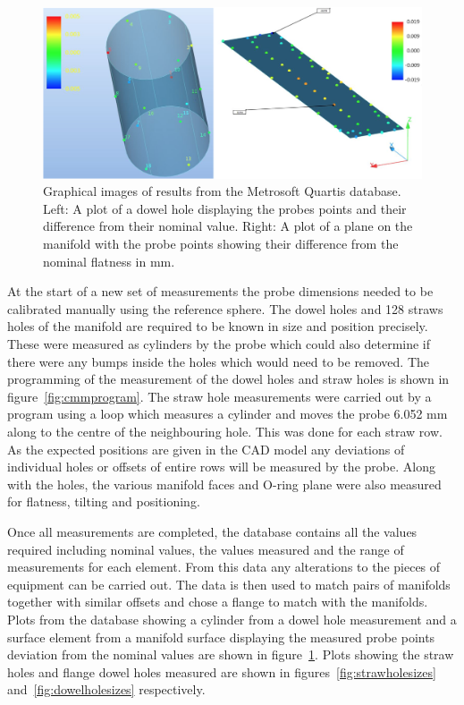 \begin{figure}[ht]
\centering
\includegraphics[scale=0.35]{Figures/cmmresults.png}
\decoRule
\caption{Graphical images of results from the Metrosoft Quartis database. Left: A plot of a dowel hole displaying the probes points and their difference from their nominal value. Right: A plot of a plane on the manifold with the probe points showing their difference from the nominal flatness in mm.}
\label{fig:cmmresults}
\end{figure}

At the start of a new set of measurements the probe dimensions needed to be calibrated manually using the reference sphere. The dowel holes and 128 straws holes of the manifold are required to be known in size and position precisely. These were measured as cylinders by the probe which could also determine if there were any bumps inside the holes which would need to be removed. The programming of the measurement of the dowel holes and straw holes is shown in figure~\ref{fig:cmmprogram}. The straw hole measurements were carried out by a program using a loop which measures a cylinder and moves the probe 6.052 mm along to the centre of the neighbouring hole. This was done for each straw row. As the expected positions are given in the CAD model any deviations of individual holes or offsets of entire rows will be measured by the probe. Along with the holes, the various manifold faces and O-ring plane were also measured for flatness, tilting and positioning.

Once all measurements are completed, the database contains all the values required including nominal values, the values measured and the range of measurements for each element. From this data any alterations to the pieces of equipment can be carried out. The data is then used to match pairs of manifolds together with similar offsets and chose a flange to match with the manifolds. Plots from the database showing a cylinder from a dowel hole measurement and a surface element from a manifold surface displaying the measured probe points deviation from the nominal values are shown in figure~\ref{fig:cmmresults}. Plots showing the straw holes and flange dowel holes measured are shown in figures~\ref{fig:strawholesizes} and~\ref{fig:dowelholesizes} respectively.

